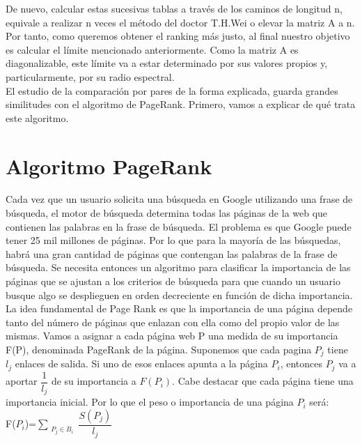 \documentclass[a4paper]{article}
\begin{document}
De nuevo, calcular estas sucesivas tablas a través de los caminos de longitud n, equivale a realizar n veces el método del doctor T.H.Wei o elevar la matriz A a n.\\


Por tanto, como queremos obtener el ranking más justo, al final nuestro objetivo es calcular el límite mencionado anteriormente. Como la matriz A es diagonalizable, este límite va a estar determinado por sus valores propios y, particularmente, por su radio espectral.\\


El estudio de la comparación por pares de la forma explicada, guarda grandes similitudes con el algoritmo de PageRank. Primero, vamos a explicar de qué trata este algoritmo.\\


\section{Algoritmo PageRank}
	Cada vez que un usuario solicita una búsqueda en Google utilizando una frase de búsqueda, el motor de búsqueda determina todas las páginas de la web que contienen las palabras en la frase de búsqueda. El problema es que Google puede tener 25 mil millones de páginas. Por lo que para la mayoría de las búsquedas, habrá una gran cantidad de páginas que contengan las palabras de la frase de búsqueda. Se necesita entonces un algoritmo para clasificar la importancia de las páginas que se ajustan a los criterios de búsqueda para que cuando un usuario busque algo se desplieguen en orden decreciente en función de dicha importancia.
\\

	 La idea fundamental de Page Rank es que la importancia de una página depende tanto del número de páginas que enlazan con ella como del propio valor de las mismas. Vamos a asignar a cada página web P una medida de su importancia F(P), denominada PageRank de la página. Suponemos que cada pagina $P_j$ tiene $l_j$ enlaces de salida. Si uno de esos enlaces apunta a la página $P_i$, entonces $P_j$ va a aportar $\dfrac{1}{l_j}$ de su importancia a $F(P_i)$. Cabe destacar que cada página tiene una importancia inicial. Por lo que el peso o importancia  de una página $P_i$ será:
\\

\hspace{5cm}F($P_i$)=$\sum_{\substack{P_j \in B_i}} \dfrac{S(P_j)}{l_j}$ 
\\
\end{document}
